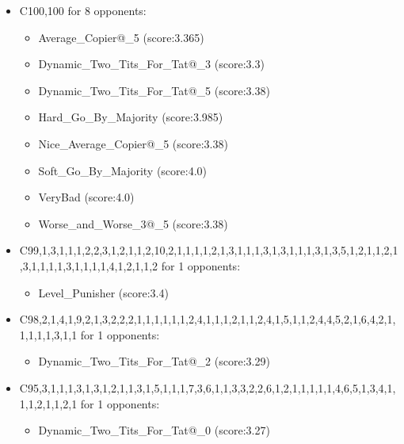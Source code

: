 \begin{appendices}
\begin{itemize}
        \item C100,100 for 8 opponents:
        \begin{multicols}{3}
            \begin{itemize}
                \item Average\_Copier@\_5 (score:3.365)
                \item Dynamic\_Two\_Tits\_For\_Tat@\_3 (score:3.3)
                \item Dynamic\_Two\_Tits\_For\_Tat@\_5 (score:3.38)
                \item Hard\_Go\_By\_Majority (score:3.985)
                \item Nice\_Average\_Copier@\_5 (score:3.38)
                \item Soft\_Go\_By\_Majority (score:4.0)
                \item VeryBad (score:4.0)
                \item Worse\_and\_Worse\_3@\_5 (score:3.38)
            \end{itemize}
        \end{multicols}

        \item C99,1,3,1,1,1,2,2,3,1,2,1,1,2,10,2,1,1,1,1,2,1,3,1,1,1,3,1,3,1,1,1,3,1,3,5,1,2,1,1,2,1,3,1,1,1,1,3,1,1,1,1,4,1,2,1,1,2 for 1 opponents:
        \begin{multicols}{3}
            \begin{itemize}
                \item Level\_Punisher (score:3.4)
            \end{itemize}
        \end{multicols}

        \item C98,2,1,4,1,9,2,1,3,2,2,2,1,1,1,1,1,1,2,4,1,1,1,2,1,1,2,4,1,5,1,1,2,4,4,5,2,1,6,4,2,1,1,1,1,1,3,1,1 for 1 opponents:
        \begin{multicols}{3}
            \begin{itemize}
                \item Dynamic\_Two\_Tits\_For\_Tat@\_2 (score:3.29)
            \end{itemize}
        \end{multicols}

        \item C95,3,1,1,1,3,1,3,1,2,1,1,3,1,5,1,1,1,7,3,6,1,1,3,3,2,2,6,1,2,1,1,1,1,1,4,6,5,1,3,4,1,1,1,2,1,1,2,1 for 1 opponents:
        \begin{multicols}{3}
            \begin{itemize}
                \item Dynamic\_Two\_Tits\_For\_Tat@\_0 (score:3.27)
            \end{itemize}
        \end{multicols}


\end{itemize}
\end{appendices}
